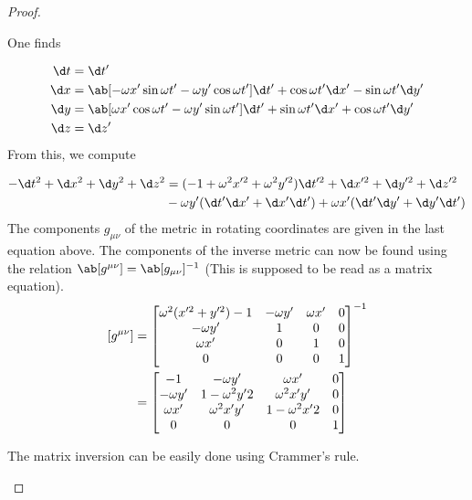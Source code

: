 \begin{proof}
\begin{enumerate}[label=(\alph*)]
        One finds
        
        \[\begin{aligned}
            \d t&=\d t'\\
            \d x&=\ab[-\omega x'\sin\omega t'-\omega y'\cos\omega t']\d t'+\cos\omega t'\d x'-\sin\omega t'\d y'\\
            \d y&=\ab[\omega x'\cos\omega t'-\omega y'\sin\omega t']\d t'+\sin\omega t'\d x'+\cos\omega t'\d y'\\
            \d z&=\d z'
        \end{aligned}\]
         From this, we compute
        
        \[\begin{aligned}
            -\d t^2+\d x^2+\d y^2+\d z^2&=(-1+\omega^2x'^2+\omega^2y'^2)\d t'^2+\d x'^2+\d y'^2+\d z'^2\\
            &-\omega y'(\d t'\d x'+\d x'\d t')+\omega x'(\d t'\d y'+\d y'\d t')
        \end{aligned}\]
         The components $g_{\mu\nu}$ of the metric in rotating coordinates are given in the last equation above. The components of the inverse metric can now be found using the relation $\ab[g^{\mu\nu}]=\ab[g_{\mu\nu}]^{-1}$ (This is supposed to be read as a matrix equation).
         \[\begin{aligned}\relax
            [g^{\mu\nu}]&=
            \begin{bmatrix}
                \omega^2(x'^2+y'^2)-1&-\omega y'&\omega x'&0\\
                -\omega y'&1&0&0\\
                \omega x'&0&1&0\\
                0&0&0&1
            \end{bmatrix}^{-1}\\
            &=\begin{bmatrix}
                -1&-\omega y'&\omega x'&0\\
                -\omega y'&1-\omega^2y'2&\omega^2x'y'&0\\
                \omega x'&\omega^2x'y'&1-\omega^2x'2&0\\
                0&0&0&1
            \end{bmatrix} 
        \end{aligned}\]

         The matrix inversion can be easily done using Crammer's rule.
    \end{enumerate}
\end{proof}
